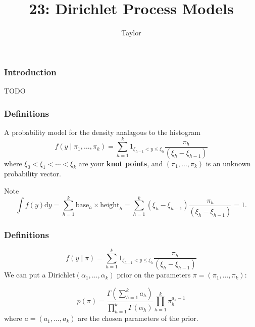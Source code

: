 \documentclass{beamer}
\title["23"]{23: Dirichlet Process Models}
\author{Taylor}
\institute[UVA] 
{
University of Virginia \\
\medskip
\textit{} 
}
\date{}
\begin{document}

\begin{frame}
\titlepage 
\end{frame}

\begin{frame}
\frametitle{Introduction}

TODO

\end{frame}
\begin{frame}
\frametitle{Definitions}

A probability model for the density analagous to the histogram 
$$
f(y \mid \pi_1, \ldots, \pi_k) = \sum_{h=1}^k 1_{\xi_{h-1} < y \le \xi_{h} } \frac{\pi_h}{(\xi_{h} - \xi_{h-1})}
$$
where $\xi_0 < \xi_1 < \cdots < \xi_k$ are your {\bf knot points}, and $(\pi_1, \ldots, \pi_k)$ is an unknown probability vector. 
\newline
\pause

Note
$$
\int f(y) \text{d}y = \sum_{h=1}^k \text{base}_h \times \text{height}_h = \sum_{h=1}^k (\xi_{h} - \xi_{h-1})\frac{\pi_h}{(\xi_{h} - \xi_{h-1})} = 1.
$$

\end{frame}


\begin{frame}
\frametitle{Definitions}

$$
f(y \mid \pi) = \sum_{h=1}^k 1_{\xi_{h-1} < y \le \xi_{h} } \frac{\pi_h}{(\xi_{h} - \xi_{h-1})}
$$
We can put a $\text{Dirichlet}(\alpha_1, \ldots, \alpha_k)$ prior on the parameters $\pi = (\pi_1, \ldots, \pi_k)$:

$$
p(\pi ) = \frac{\Gamma\left( \sum_{h=1}^k a_h \right) }{\prod_{h=1}^k \Gamma(\alpha_h) } \prod_{h=1}^k \pi_h^{a_h-1}
$$
where $a = (a_1, \ldots, a_k)$ are the chosen parameters of the prior.

\end{frame}
\end{document}
